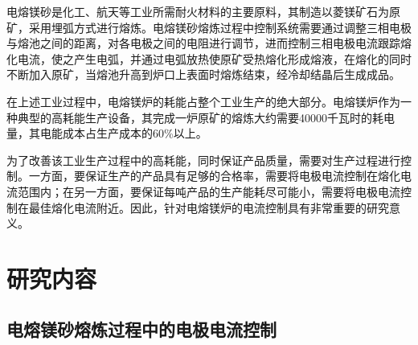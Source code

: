 \documentclass[UTF8, 12pt]{article}
\begin{document}
电熔镁砂是化工、航天等工业所需耐火材料的主要原料，其制造以菱镁矿石为原矿，采用埋弧方式进行熔炼。电熔镁砂熔炼过程中控制系统需要通过调整三相电极与熔池之间的距离，对各电极之间的电阻进行调节，进而控制三相电极电流跟踪熔化电流，使之产生电弧，并通过电弧放热使原矿受热熔化形成熔液，在熔化的同时不断加入原矿，当熔池升高到炉口上表面时熔炼结束，经冷却结晶后生成成品。

在上述工业过程中，电熔镁炉的耗能占整个工业生产的绝大部分。电熔镁炉作为一种典型的高耗能生产设备，其完成一炉原矿的熔炼大约需要40000千瓦时的耗电量，其电能成本占生产成本的60\%以上。

为了改善该工业生产过程中的高耗能，同时保证产品质量，需要对生产过程进行控制。一方面，要保证生产的产品具有足够的合格率，需要将电极电流控制在熔化电流范围内；在另一方面，要保证每吨产品的生产能耗尽可能小，需要将电极电流控制在最佳熔化电流附近。因此，针对电熔镁炉的电流控制具有非常重要的研究意义。





%
\section{研究内容}

\subsection{电熔镁砂熔炼过程中的电极电流控制}



\end{document}
